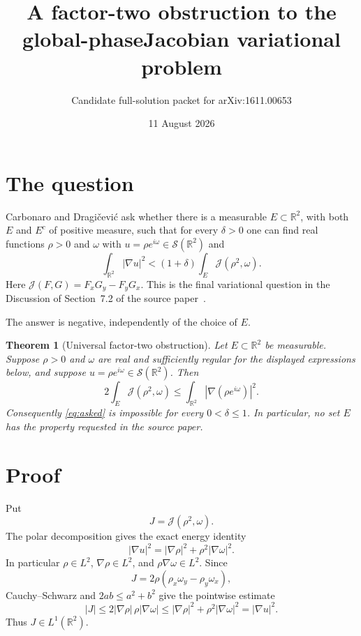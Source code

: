 \documentclass[10pt]{article}
\title{A factor-two obstruction to the global-phase\newline Jacobian variational problem}
\author{Candidate full-solution packet for arXiv:1611.00653}
\date{11 August 2026}
\newtheorem{theorem}{Theorem}
\newcommand{\R}{\mathbb R}
\newcommand{\cS}{\mathcal S}
\newcommand{\Jac}{\mathscr J}
\begin{document}
\maketitle

\begin{center}
\end{center}

\section{The question}

Carbonaro and Dragi\v cevi\'c ask whether there is a measurable
$E\subset\R^2$, with both $E$ and $E^c$ of positive measure, such that for
every $\delta>0$ one can find real functions $\rho>0$ and $\omega$ with
$u=\rho e^{i\omega}\in\cS(\R^2)$ and
\begin{equation}\label{eq:asked}
 \int_{\R^2}|\nabla u|^2
 <(1+\delta)\int_E\Jac(\rho^2,\omega).
\end{equation}
Here $\Jac(F,G)=F_xG_y-F_yG_x$.  This is the final variational question in
the Discussion of Section~7.2 of the source paper~\cite{CD}.

The answer is negative, independently of the choice of $E$.

\begin{theorem}[Universal factor-two obstruction]\label{thm:main}
Let $E\subset\R^2$ be measurable.  Suppose $\rho>0$ and $\omega$ are real
and sufficiently regular for the displayed expressions below, and suppose
$u=\rho e^{i\omega}\in\cS(\R^2)$.  Then
\begin{equation}\label{eq:factor2}
 \boxed{\quad
  2\int_E\Jac(\rho^2,\omega)
  \leq \int_{\R^2}|\nabla(\rho e^{i\omega})|^2.
 \quad}
\end{equation}
Consequently \eqref{eq:asked} is impossible for every $0<\delta\leq1$.
In particular, no set $E$ has the property requested in the source paper.
\end{theorem}

\section{Proof}

Put
\[
 J=\Jac(\rho^2,\omega).
\]
The polar decomposition gives the exact energy identity
\begin{equation}\label{eq:energy}
 |\nabla u|^2=|\nabla\rho|^2+\rho^2|\nabla\omega|^2.
\end{equation}
In particular $\rho\in L^2$, $\nabla\rho\in L^2$, and
$\rho\nabla\omega\in L^2$.  Since
\[
 J=2\rho(\rho_x\omega_y-\rho_y\omega_x),
\]
Cauchy--Schwarz and $2ab\leq a^2+b^2$ give the pointwise estimate
\begin{equation}\label{eq:pointwise}
 |J|
 \leq 2|\nabla\rho|\,\rho|\nabla\omega|
 \leq |\nabla\rho|^2+\rho^2|\nabla\omega|^2
 =|\nabla u|^2.
\end{equation}
Thus $J\in L^1(\R^2)$.
\end{document}
